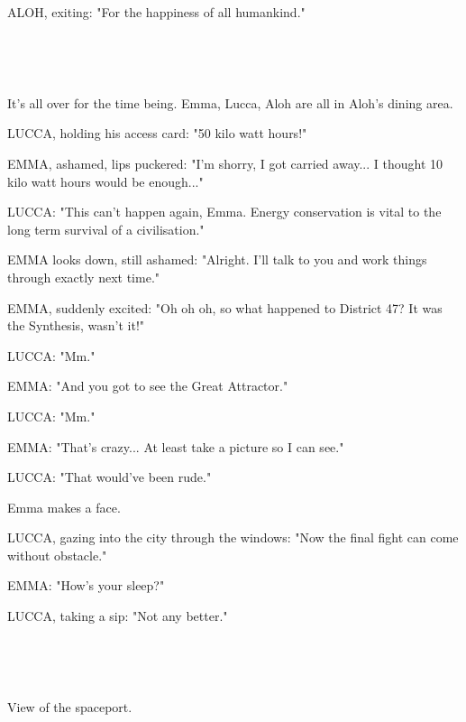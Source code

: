 \documentclass[11pt]{article}
\begin{document}
ALOH, exiting: "For the happiness of all humankind."

\ 

\ 

It's all over for the time being.
Emma, Lucca, Aloh are all in Aloh's dining area.

LUCCA, holding his access card: "50 kilo watt hours!"

EMMA, ashamed, lips puckered: "I'm shorry, I got carried away...
I thought 10 kilo watt hours would be enough..."

LUCCA: "This can't happen again, Emma.
Energy conservation is vital to the long term survival of a civilisation."

EMMA looks down, still ashamed: "Alright. I'll talk to you and work things through exactly next time."

EMMA, suddenly excited: "Oh oh oh, so what happened to District 47?
It was the Synthesis, wasn't it!"

LUCCA: "Mm."

EMMA: "And you got to see the Great Attractor."

LUCCA: "Mm."

EMMA: "That's crazy...
At least take a picture so I can see."

LUCCA: "That would've been rude."

Emma makes a face.

LUCCA, gazing into the city through the windows: "Now the final fight can come without obstacle."

EMMA: "How's your sleep?"

LUCCA, taking a sip: "Not any better."

\ 

\ 

View of the spaceport.
\end{document}
